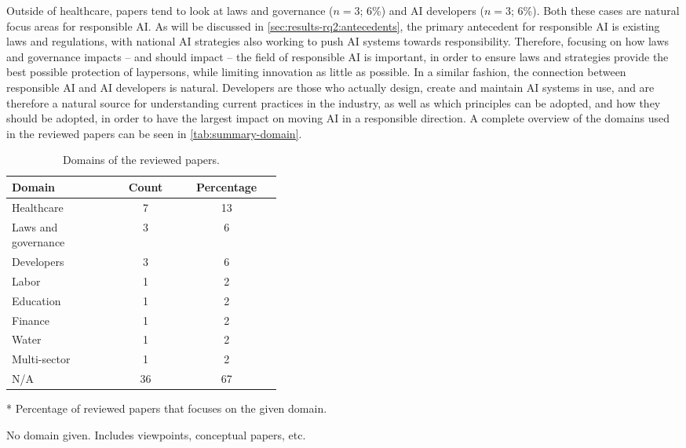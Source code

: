 Outside of healthcare, papers tend to look at laws and governance ($n = 3$; 6\%) and AI developers ($n = 3$; 6\%). Both these cases are natural focus areas for responsible AI. As will be discussed in \autoref{sec:results-rq2:antecedents}, the primary antecedent for responsible AI is existing laws and regulations, with national AI strategies also working to push AI systems towards responsibility. Therefore, focusing on how laws and governance impacts -- and should impact -- the field of responsible AI is important, in order to ensure laws and strategies provide the best possible protection of laypersons, while limiting innovation as little as possible. In a similar fashion, the connection between responsible AI and AI developers is natural. Developers are those who actually design, create and maintain AI systems in use, and are therefore a natural source for understanding current practices in the industry, as well as which principles can be adopted, and how they should be adopted, in order to have the largest impact on moving AI in a responsible direction. A complete overview of the domains used in the reviewed papers can be seen in \autoref{tab:summary-domain}.

\begin{table}[htpb]
    \centering
    \caption{Domains of the reviewed papers.}
    \label{tab:summary-domain}
    \begin{threeparttable}
    \begin{tabular}{p{0.4\linewidth}cc}
    \toprule
        \textbf{Domain} & \textbf{Count} & \textbf{Percentage}\tnote{*} \\
    \midrule
        Healthcare              & 7     & 13 \\ 
        Laws and governance     & 3     & 6 \\
        Developers              & 3     & 6 \\
        Labor                   & 1     & 2 \\
        Education               & 1     & 2 \\
        Finance                 & 1     & 2 \\
        Water                   & 1     & 2 \\
        Multi-sector            & 1     & 2 \\
        N/A\tnote{\textdagger}  & 36    & 67 \\ 
    \bottomrule
    \end{tabular}
    \begin{tablenotes}
        \footnotesize
        \item [*] Percentage of reviewed papers that focuses on the given domain.
        \item [\textdagger] No domain given. Includes viewpoints, conceptual papers, etc.
    \end{tablenotes}
\end{threeparttable}
\end{table}

